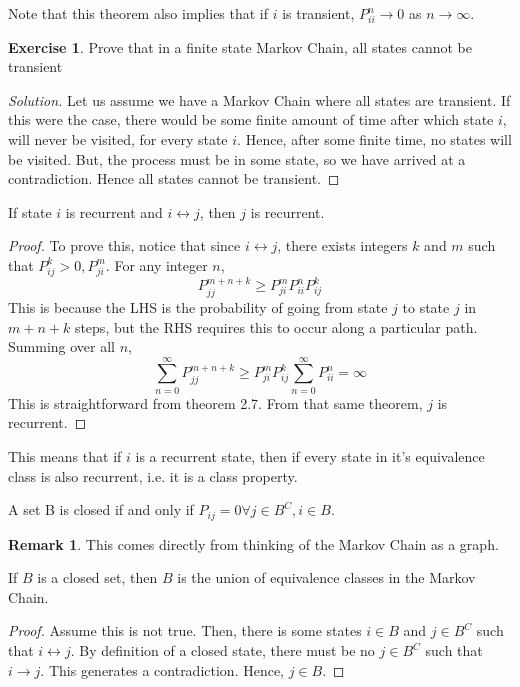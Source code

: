 \documentclass[12pt,letterpaper]{amsbook}
\theoremstyle{definition}
\newtheorem*{remark}{Remark}
\newtheorem*{exercise}{Exercise}
\newenvironment{solution}
  {\renewcommand\qedsymbol{$\blacksquare$}\begin{proof}[Solution]}
  {\end{proof}}
\begin{document}
Note that this theorem also implies that if $i$ is transient, $P_{ii}^n \rightarrow 0$ as $n \rightarrow \infty$.

\begin{exercise}
  Prove that in a finite state Markov Chain, all states cannot be transient 
\end{exercise}
\begin{solution}
Let us assume we have a Markov Chain where all states are transient. If this were the case, there would be some finite amount of time after which state $i$, will never be visited, for every state $i$. Hence, after some finite time, no states will be visited. But, the process must be in some state, so we have arrived at a contradiction. Hence all states cannot be transient.
\end{solution}

\begin{theorem}
  If state $i$ is recurrent and $i \leftrightarrow j$, then $j$ is recurrent.
\end{theorem}
\begin{proof}
  To prove this, notice that since $i \leftrightarrow j$, there exists integers $k$ and $m$ such that $P^k_{ij} > 0, P^{m}_{ji}$. For any integer $n$, 
  \[P_{jj}^{m+n+k} \geq P_{ji}^m P_{ii}^n P_{ij}^k\]
  This is because the LHS is the probability of going from state $j$ to state $j$ in $m+n+k$ steps, but the RHS requires this to occur along a particular path. Summing over all $n$, 
  \[\sum_{n=0}^{\infty} P_{jj}^{m+n+k} \geq P_{ji}^m P_{ij}^k \sum_{n=0}^{\infty} P_{ii}^n = \infty\]
  This is straightforward from theorem 2.7. From that same theorem, $j$ is recurrent.
\end{proof}

This means that if $i$ is a recurrent state, then if every state in it's equivalence class is also recurrent, i.e. it is a class property.

\begin{theorem}
  A set B is closed if and only if $P_{ij} = 0 \forall j \in B^C, i \in B$.  
\end{theorem}
\begin{remark}
  This comes directly from thinking of the Markov Chain as a graph.
\end{remark}

\begin{theorem}
  If $B$ is a closed set, then $B$ is the union of equivalence classes in the Markov Chain.
\end{theorem}
\begin{proof}
  Assume this is not true. Then, there is some states $i \in B$ and $j \in B^C$ such that $i \leftrightarrow j$. By definition of a closed state, there must be no $j \in B^C$ such that $i \rightarrow j$. This generates a contradiction. Hence, $j \in B$.
\end{proof}
\end{document}
